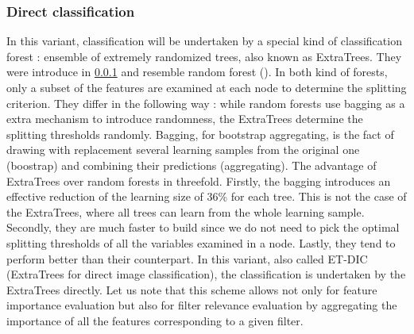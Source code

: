 \documentclass[a4paper]{report}
\begin{document}
			\subsubsection{Direct classification}
			In this variant, classification will be undertaken by a special kind of classification forest : ensemble of extremely randomized trees, also known as ExtraTrees. They were introduce in \ref{} and resemble random forest (\cite{randomforests}). In both kind of forests, only a subset of the features are examined at each node to determine the splitting criterion. They differ in the following way : while random forests use bagging as a extra mechanism to introduce randomness, the ExtraTrees determine the splitting thresholds randomly. Bagging, for bootstrap aggregating, is the fact of drawing with replacement several learning samples from the original one (boostrap) and combining their predictions (aggregating). 
			The advantage of ExtraTrees over random forests in threefold. Firstly, the bagging introduces an effective reduction of the learning size of 36\% for each tree. This is not the case of the ExtraTrees, where all trees can learn from the whole learning sample. Secondly, they are much faster to build since we do not need to pick the optimal splitting thresholds of all the variables examined in a node. Lastly, they tend to perform better than their counterpart.%
			In this variant, also called ET-DIC (ExtraTrees for direct image classification), the classification is undertaken by the ExtraTrees directly.
			Let us note that this scheme allows not only for feature importance evaluation but also for filter relevance evaluation by aggregating the importance of all the features corresponding to a given filter. %
			
			
			
\end{document}
